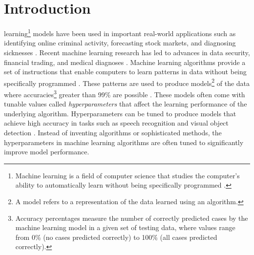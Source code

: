 



\section{Introduction} \label{introduction}

 learning\footnote{Machine learning is a field of computer science that studies the computer's ability to automatically learn without being specifically programmed \cite{Samuel:2000}.} models have been used in important real-world applications such as identifying online criminal activity, forecasting stock markets, and diagnosing sicknesses \cite{Buczak:2016,Heaton:2017,Muandet:2017}. Recent machine learning research has led to advances in data security, financial trading, and medical diagnoses \cite{Deng:2014,deBruijne:2016}. Machine learning algorithms provide a set of instructions that enable computers to learn patterns in data without being specifically programmed \cite{LeCun:2015}. These patterns are used to produce models\footnote{A model refers to a representation of the data learned using an algorithm.} of the data where accuracies\footnote{Accuracy percentages measure the number of correctly predicted cases by the machine learning model in a given set of testing data, where values range from 0\% (no cases predicted correctly) to 100\% (all cases predicted correctly).} greater than 99\% are possible \cite{Schmidhuber:2015}.  These models often come with tunable values called \textit{hyperparameters} that affect the learning performance of the underlying algorithm. Hyperparameters can be tuned to produce models that achieve high accuracy in tasks such as speech recognition and visual object detection \cite{Deng:2013,Guo:2016,Bergstra:2011}. Instead of inventing algorithms or sophisticated methods, the hyperparameters in machine learning algorithms are often tuned to significantly improve model performance.

